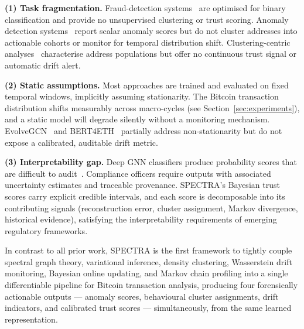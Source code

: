\documentclass[journal]{IEEEtran}
\begin{document}
\smallskip
\noindent\textbf{(1) Task fragmentation.}
Fraud-detection systems~\cite{Weber2019,Jha2023,Fan2024} are optimised for
binary classification and provide no unsupervised clustering or trust scoring.
Anomaly detection systems~\cite{Liu2024,AnCho2015} report scalar anomaly scores
but do not cluster addresses into actionable cohorts or monitor for temporal
distribution shift.  Clustering-centric analyses~\cite{Meiklejohn2013,Jourdan2019}
characterise address populations but offer no continuous trust signal or
automatic drift alert.

\smallskip
\noindent\textbf{(2) Static assumptions.}
Most approaches are trained and evaluated on fixed temporal windows, implicitly
assuming stationarity.  The Bitcoin transaction distribution shifts measurably
across macro-cycles (see Section~\ref{sec:experiments}), and a static model
will degrade silently without a monitoring mechanism.  EvolveGCN~\cite{Pareja2020}
and BERT4ETH~\cite{He2023} partially address non-stationarity but do not expose
a calibrated, auditable drift metric.

\smallskip
\noindent\textbf{(3) Interpretability gap.}
Deep GNN classifiers produce probability scores that are difficult to
audit~\cite{Chalapathy2019}.  Compliance officers require outputs with
associated uncertainty estimates and traceable provenance.  SPECTRA's
Bayesian trust scores carry explicit credible intervals, and each score is
decomposable into its contributing signals (reconstruction error, cluster
assignment, Markov divergence, historical evidence), satisfying the
interpretability requirements of emerging regulatory frameworks.

\smallskip
In contrast to all prior work, SPECTRA is the first framework to tightly couple
spectral graph theory, variational inference, density clustering, Wasserstein
drift monitoring, Bayesian online updating, and Markov chain profiling into a
single differentiable pipeline for Bitcoin transaction analysis, producing four
forensically actionable outputs --- anomaly scores, behavioural cluster
assignments, drift indicators, and calibrated trust scores --- simultaneously,
from the same learned representation.


\end{document}
